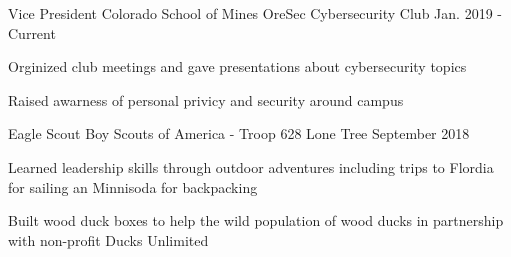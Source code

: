 

\begin{cventries}

  \cventry
    {Vice President} %
    {Colorado School of Mines OreSec Cybersecurity Club} %
    {} %
    {Jan. 2019 - Current} %
    {
      \begin{cvitems} %
        \item {Orginized club meetings and gave presentations about
            cybersecurity topics}
        \item {Raised awarness of personal privicy and security around campus}
      \end{cvitems}
    }

  \cventry
    {Eagle Scout} %
    {Boy Scouts of America - Troop 628} %
    {Lone Tree} %
    {September 2018} %
    {
      \begin{cvitems} %
        \item {Learned leadership skills through outdoor adventures
            including trips to Flordia for sailing an Minnisoda for
            backpacking}
        \item {Built wood duck boxes to help the wild population of
            wood ducks in partnership with non-profit Ducks Unlimited}
      \end{cvitems}
    }

\end{cventries}
